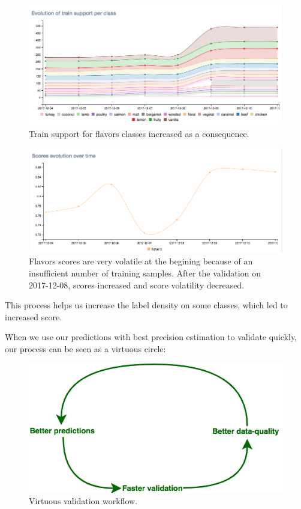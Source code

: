 \begin{figure}[H]
\centering
\includegraphics[scale=0.5]{./images/incompletely-labeled/train-support-flavors.png}
\caption{Train support for flavors classes increased as a consequence.}
\end{figure}


\begin{figure}[H]
\centering
\includegraphics[scale=0.5]{./images/incompletely-labeled/scores-flavors.png}
\caption{Flavors scores are very volatile at the begining because of an insufficient number of training samples. After the validation on 2017-12-08, scores increased and score volatility decreased.}
\end{figure}


This process helps us increase the label density on some classes, which led to increased score.

When we use our predictions with best precision estimation to validate quickly, our process can be seen as a virtuous circle:
\begin{figure}[H]
\centering
\includegraphics[scale=0.6]{./images/incompletely-labeled/virtuous-circle.png}
\caption{Virtuous validation workflow.}
\end{figure}

